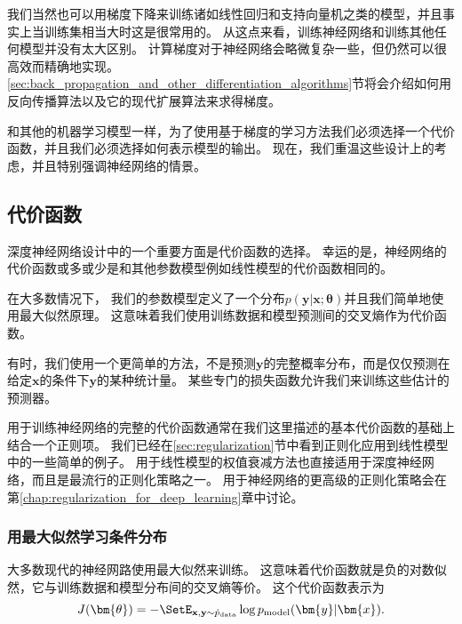 
我们当然也可以用梯度下降来训练诸如线性回归和支持向量机之类的模型，并且事实上当训练集相当大时这是很常用的。
从这点来看，训练神经网络和训练其他任何模型并没有太大区别。
计算梯度对于神经网络会略微复杂一些，但仍然可以很高效而精确地实现。
\ref{sec:back_propagation_and_other_differentiation_algorithms}节将会介绍如何用反向传播算法以及它的现代扩展算法来求得梯度。

和其他的机器学习模型一样，为了使用基于梯度的学习方法我们必须选择一个代价函数，并且我们必须选择如何表示模型的输出。
现在，我们重温这些设计上的考虑，并且特别强调神经网络的情景。

\subsection{代价函数}
\label{sec:cost_functions}

深度神经网络设计中的一个重要方面是代价函数的选择。
幸运的是，神经网络的代价函数或多或少是和其他参数模型例如线性模型的代价函数相同的。

在大多数情况下， 我们的参数模型定义了一个分布$p(\bm{y}|\bm{x};\bm{\theta})$并且我们简单地使用最大似然原理。
这意味着我们使用训练数据和模型预测间的交叉熵作为代价函数。

有时，我们使用一个更简单的方法，不是预测$\bm{y}$的完整概率分布，而是仅仅预测在给定$\bm{x}$的条件下$\bm{y}$的某种统计量。
某些专门的损失函数允许我们来训练这些估计的预测器。

用于训练神经网络的完整的代价函数通常在我们这里描述的基本代价函数的基础上结合一个正则项。
我们已经在\ref{sec:regularization}节中看到正则化应用到线性模型中的一些简单的例子。
用于线性模型的权值衰减方法也直接适用于深度神经网络，而且是最流行的正则化策略之一。
用于神经网络的更高级的正则化策略会在第\ref{chap:regularization_for_deep_learning}章中讨论。


\subsubsection{用最大似然学习条件分布}
\label{sec:learning_conditional_distributions_with_maximum_likelihood}

大多数现代的神经网路使用最大似然来训练。
这意味着代价函数就是负的对数似然，它与训练数据和模型分布间的交叉熵等价。
这个代价函数表示为
\begin{equation}
J(\bm{\theta}) = -\SetE_{\mathbf{x}, \mathbf{y} \sim \hat{p}_\text{data}} \log p_\text{model} (\bm{y} \vert \bm{x}).
\end{equation}

